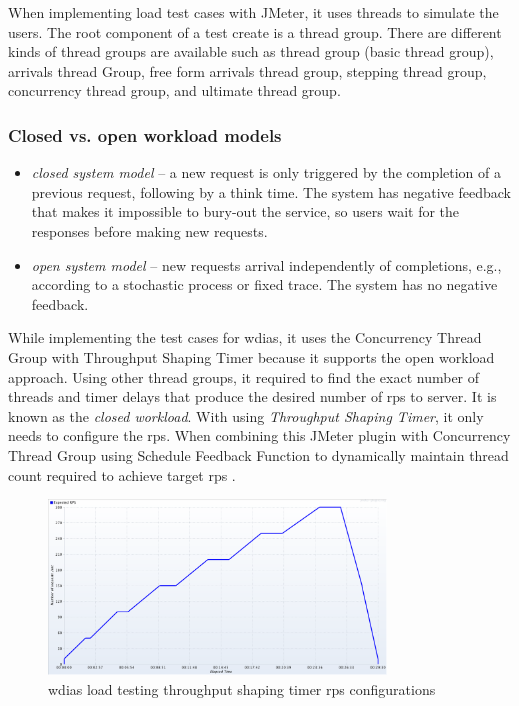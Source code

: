 When implementing load test cases with  JMeter, it uses threads to simulate the users. The root component of a test create is a thread group. There are different kinds of thread groups are available such as thread group (basic thread group), arrivals thread Group, free form arrivals thread group, stepping thread group, concurrency thread group, and ultimate thread group.


\subsubsection{Closed vs. open workload models}
\label{subse:closed_vs_open_workload}
\begin{itemize}
    \item \emph{closed system model} \cite{Haggett1998AnWales} -- a new request is only triggered by the completion of a previous request, following by a think time. The system has negative feedback that makes it impossible to bury-out the service, so users wait for the responses before making new requests.
    \item \emph{open system model} -- new requests arrival independently of completions, e.g., according to a stochastic process or fixed trace. The system has no negative feedback.
\end{itemize}
While implementing the test cases for \acrshort{wdias}, it uses the Concurrency Thread Group with Throughput Shaping Timer because it supports the open workload approach.
Using other thread groups, it required to find the exact number of threads and timer delays that produce the desired number of \acrfull{rps} to server. It is known as the \emph{closed workload}.
With using \emph{Throughput Shaping Timer}, it only needs to configure the \acrshort{rps}. When combining this  JMeter plugin with Concurrency Thread Group using Schedule Feedback Function to dynamically maintain thread count required to achieve target \acrshort{rps} \cite{KarunarathneGihanWdias/wdias-performance-test:JMeter.}.

\begin{figure}[htp]
    \centering
    \includegraphics[width=0.8\textwidth]{results/work_load/test_prod_throughtput_shaping_timer.png}
    \caption{\acrshort{wdias} load testing throughput shaping timer \acrshort{rps} configurations}
    \label{fi:test_prod_throughtput_shaping_timer}
\end{figure}

